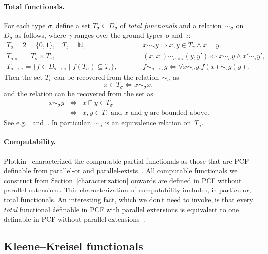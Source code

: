 \documentclass{LMCS}
\newcommand{\myparagraph}{\paragraph}
\newcommand{\N}{\mathbb{N}}
\newcommand{\Bool}{2}\newcommand{\Sierp}{\mathcal{S}}
\newcommand{\True}{1}\newcommand{\False}{0}\newcommand{\domain}[1]{{\D_{#1}}}
\newcommand{\total}[1]{{\T_{#1}}}
\newcommand{\totaleq}[1]{\sim_{#1}}
\newcommand{\D}{D}
\newcommand{\T}{T}
\newcommand{\tproduct}{\sigma \times \tau}
\newcommand{\tfunction}{\sigma \to \tau}
\newcommand{\siff}{\iff}\newcommand{\Search}{\operatorname{\mathcal{S}}}
\begin{document}
\myparagraph{Total functionals.} 
For each type $\sigma$, define a set $\total{\sigma}\subseteq \domain{\sigma}$ of \emph{total
  functionals} and a relation~$\totaleq{\sigma}$ on~$\domain{\sigma}$
as follows, where $\gamma$ ranges over the ground types~$o$ and~$\iota$:
\[
\begin{array}{lcl}
\total{o} = \Bool = \{\False,\True\}, \quad \total{\iota} = \N,
& \qquad & x \totaleq{\gamma} y \siff x,y \in \total{\gamma}
    \wedge x = y. \\[1ex]
\total{\tproduct} = \total{\sigma} \times \total{\tau},
&  & 
(x,x') \totaleq{\tproduct} (y,y') \siff \text{$x \totaleq{\sigma} y \land x' \totaleq{\tau} y'$}, \\[1ex]
\total{\tfunction} = \{ f \in \domain{\tfunction} \mid f(\total{\sigma}) \subseteq
\total{\tau} \},
& & 
{f \totaleq{\tfunction} g \siff \forall  x \totaleq{\sigma} y. f(x) \totaleq{\tau} g(y).}
\end{array}
\]
Then the set $\total{\sigma}$ can be recovered from the
relation~$\totaleq{\sigma}$ as 
\[ x \in \total{\sigma} \siff x \totaleq{\sigma} x, \]
and the relation can be recovered from the set as
\begin{eqnarray*}
x \totaleq{\sigma} y & \siff & x \sqcap y \in \total{\sigma} \\
& \siff & x,y
\in \total{\sigma} \text{ and $x$ and $y$ are bounded above}.
\end{eqnarray*}
See e.g.~\cite{berger:total} and~\cite{plotkin:totality}. In
particular, $\totaleq{\sigma}$ is an equivalence relation
on~$\total{\sigma}$.

\myparagraph{Computability.}  Plotkin~\cite{plotkin:lcf} characterized
the computable partial functionals as those that are PCF-definable
from parallel-or and parallel-exists~\cite{plotkin:lcf}.  All
computable functionals we construct from Section~\ref{characterization} onwards
are defined in PCF without parallel extensions. This characterization
of computability includes, in particular, total functionals. An
interesting fact, which we don't need to invoke, is that every
\emph{total} functional definable in PCF with parallel extensions is
equivalent to one definable in PCF without parallel
extensions~\cite{normann:totality}.

\subsection{Kleene--Kreisel functionals} \label{kk:background}
\end{document}
